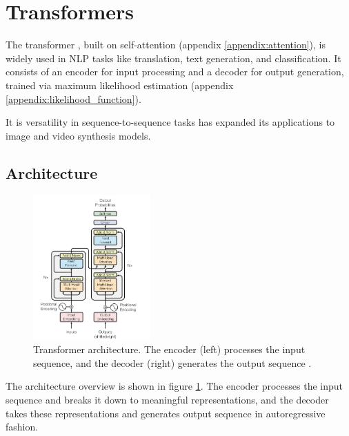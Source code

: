 \section{Transformers}
\label{appendix:transformers}

The transformer \cite{transformer}, built on self-attention (appendix \ref{appendix:attention}), is widely used in NLP tasks like translation, text generation, and classification. It consists of an encoder for input processing and a decoder for output generation, trained via maximum likelihood estimation (appendix \ref{appendix:likelihood_function}).

It is versatility in sequence-to-sequence tasks has expanded its applications to image and video synthesis models.





\subsection{Architecture}

\begin{figure}
    \centering
    \includegraphics[width=0.4\textwidth]{images/appendix/transformer/architecture.png}
    \caption{Transformer architecture. The encoder (left) processes the input sequence, and the decoder (right) generates the output sequence \cite{transformer}.}
    \label{fig:appendix_transformer_architecture}
\end{figure}

The architecture overview is shown in figure \ref{fig:appendix_transformer_architecture}. The encoder processes the input sequence and breaks it down to meaningful representations, and the decoder takes these representations and generates output sequence in autoregressive fashion. 








